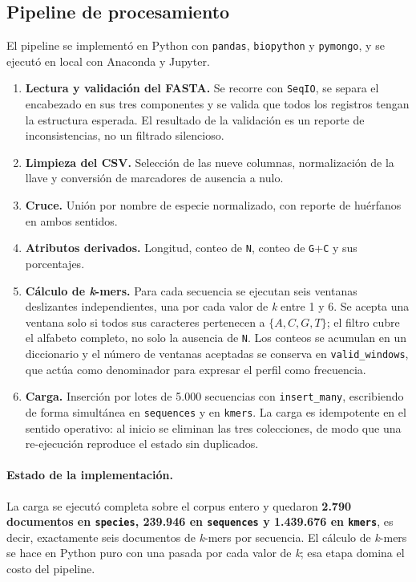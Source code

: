 \documentclass[journal]{IEEEtran}
\begin{document}
\subsection{Pipeline de procesamiento}
El pipeline se implementó en Python con \texttt{pandas}, \texttt{biopython} y
\texttt{pymongo}, y se ejecutó en local con Anaconda y Jupyter.
\begin{enumerate}
  \item \textbf{Lectura y validación del FASTA.} Se recorre con \texttt{SeqIO}, se separa
        el encabezado en sus tres componentes y se valida que todos los registros tengan la
        estructura esperada. El resultado de la validación es un reporte de
        inconsistencias, no un filtrado silencioso.
  \item \textbf{Limpieza del CSV.} Selección de las nueve columnas, normalización de la
        llave y conversión de marcadores de ausencia a nulo.
  \item \textbf{Cruce.} Unión por nombre de especie normalizado, con reporte de huérfanos
        en ambos sentidos.
  \item \textbf{Atributos derivados.} Longitud, conteo de \texttt{N}, conteo de
        \texttt{G}+\texttt{C} y sus porcentajes.
  \item \textbf{Cálculo de \textit{k}-mers.} Para cada secuencia se ejecutan seis ventanas
        deslizantes independientes, una por cada valor de \textit{k} entre 1 y 6. Se acepta
        una ventana solo si todos sus caracteres pertenecen a $\{A, C, G, T\}$; el filtro
        cubre el alfabeto completo, no solo la ausencia de \texttt{N}. Los conteos se
        acumulan en un diccionario y el número de ventanas aceptadas se conserva en
        \texttt{valid\_windows}, que actúa como denominador para expresar el perfil como
        frecuencia.
  \item \textbf{Carga.} Inserción por lotes de 5.000 secuencias con \texttt{insert\_many},
        escribiendo de forma simultánea en \texttt{sequences} y en \texttt{kmers}. La carga
        es idempotente en el sentido operativo: al inicio se eliminan las tres colecciones,
        de modo que una re-ejecución reproduce el estado sin duplicados.
\end{enumerate}

\paragraph*{Estado de la implementación.}
La carga se ejecutó completa sobre el corpus entero y quedaron \textbf{2.790 documentos en
\texttt{species}, 239.946 en \texttt{sequences} y 1.439.676 en \texttt{kmers}}, es decir,
exactamente seis documentos de \textit{k}-mers por secuencia. El cálculo de \textit{k}-mers
se hace en Python puro con una pasada por cada valor de \textit{k}; esa etapa domina el
costo del pipeline.
\end{document}
